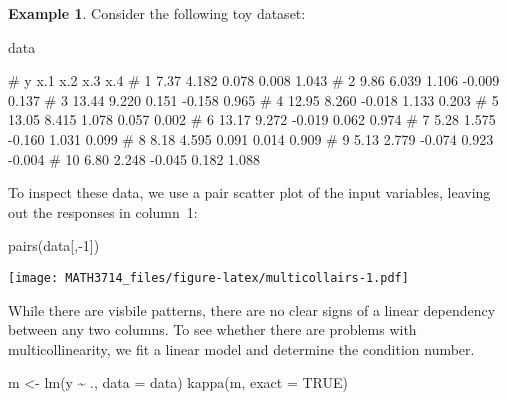 \documentclass[
  a4paper,
]{article}
\newenvironment{Shaded}{\begin{snugshade}}{\end{snugshade}}
\newcommand{\AttributeTok}[1]{\textcolor[rgb]{0.77,0.63,0.00}{#1}}
\newcommand{\ConstantTok}[1]{\textcolor[rgb]{0.00,0.00,0.00}{#1}}
\newcommand{\DecValTok}[1]{\textcolor[rgb]{0.00,0.00,0.81}{#1}}
\newcommand{\FunctionTok}[1]{\textcolor[rgb]{0.00,0.00,0.00}{#1}}
\newcommand{\NormalTok}[1]{#1}
\newcommand{\OtherTok}[1]{\textcolor[rgb]{0.56,0.35,0.01}{#1}}
\newcommand{\SpecialCharTok}[1]{\textcolor[rgb]{0.00,0.00,0.00}{#1}}
\theoremstyle{definition}
\theoremstyle{definition}
\newtheorem{example}{Example}[section]
\theoremstyle{definition}
\theoremstyle{definition}
\theoremstyle{remark}
\begin{document}
\begin{example}
\protect\hypertarget{exm:multicollell}{}\label{exm:multicollell}Consider the following toy dataset:

\begin{Shaded}
\begin{Highlighting}[]
\NormalTok{data}
\end{Highlighting}
\end{Shaded}

\begin{Shaded}
\begin{Highlighting}[]
\NormalTok{\#        y   x.1    x.2    x.3    x.4}
\NormalTok{\# 1   7.37 4.182  0.078  0.008  1.043}
\NormalTok{\# 2   9.86 6.039  1.106 {-}0.009  0.137}
\NormalTok{\# 3  13.44 9.220  0.151 {-}0.158  0.965}
\NormalTok{\# 4  12.95 8.260 {-}0.018  1.133  0.203}
\NormalTok{\# 5  13.05 8.415  1.078  0.057  0.002}
\NormalTok{\# 6  13.17 9.272 {-}0.019  0.062  0.974}
\NormalTok{\# 7   5.28 1.575 {-}0.160  1.031  0.099}
\NormalTok{\# 8   8.18 4.595  0.091  0.014  0.909}
\NormalTok{\# 9   5.13 2.779 {-}0.074  0.923 {-}0.004}
\NormalTok{\# 10  6.80 2.248 {-}0.045  0.182  1.088}
\end{Highlighting}
\end{Shaded}

To inspect these data, we use a pair scatter plot of the input variables,
leaving out the responses in column~1:

\begin{Shaded}
\begin{Highlighting}[]
\FunctionTok{pairs}\NormalTok{(data[,}\SpecialCharTok{{-}}\DecValTok{1}\NormalTok{])}
\end{Highlighting}
\end{Shaded}

\texttt{[image: MATH3714\_files/figure-latex/multicollairs-1.pdf]}

While there are visbile patterns, there are no clear signs of
a linear dependency between any two columns.
To see whether there are problems with multicollinearity, we fit
a linear model and determine the condition number.

\begin{Shaded}
\begin{Highlighting}[]
\NormalTok{m }\OtherTok{\textless{}{-}} \FunctionTok{lm}\NormalTok{(y }\SpecialCharTok{\textasciitilde{}}\NormalTok{ ., }\AttributeTok{data =}\NormalTok{ data)}
\FunctionTok{kappa}\NormalTok{(m, }\AttributeTok{exact =} \ConstantTok{TRUE}\NormalTok{)}
\end{Highlighting}
\end{Shaded}


\end{example}
\end{document}
